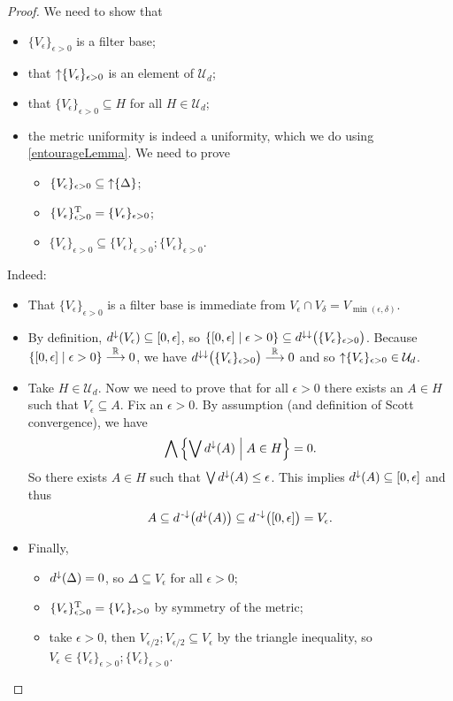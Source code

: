 \begin{proof}
We need to show that
\begin{itemize}
\item $\{V_\epsilon\}_{\epsilon>0}$ is a filter base;
\item that $\operatorname{\uparrow}\{V_\epsilon\}_{\epsilon>0}$ is an element of $\mathcal{U}_d$;
\item that $\{V_\epsilon\}_{\epsilon>0}\subseteq H$ for all $H\in \mathcal{U}_d$;
\item the metric uniformity is indeed a uniformity, which we do using \ref{entourageLemma}. We need to prove
\begin{itemize}
\item $\{V_\epsilon\}_{\epsilon>0}\subseteq\operatorname{\uparrow}\{\Delta\}$;
\item $\{V_\epsilon\}_{\epsilon>0}^{\mathrm{T}} = \{V_\epsilon\}_{\epsilon>0}$;
\item $\{V_\epsilon\}_{\epsilon>0} \subseteq \{V_\epsilon\}_{\epsilon>0}; \{V_\epsilon\}_{\epsilon>0}$.
\end{itemize}
\end{itemize}
Indeed:
\begin{itemize}
\item That $\{V_\epsilon\}_{\epsilon>0}$ is a filter base is immediate from $V_\epsilon \cap V_\delta = V_{\min(\epsilon, \delta)}$.
\item By definition, $d^{\imf}(V_\epsilon) \subseteq \interval{0,\epsilon}$, so $\setbuilder{\interval{0,\epsilon}}{\epsilon>0} \subseteq d^{\imf\imf}\big(\{V_\epsilon\}_{\epsilon>0}\big)$. Because $\setbuilder{\interval{0,\epsilon}}{\epsilon>0} \overset{\R}{\longrightarrow} 0$, we have $d^{\downarrow\downarrow}\big(\{V_\epsilon\}_{\epsilon>0}\big) \overset{\mathbb{R}}{\longrightarrow} 0$ and so $\operatorname{\uparrow}\{V_\epsilon\}_{\epsilon>0} \in \mathcal{U}_d$.
\item Take $H\in \mathcal{U}_d$. 
Now we need to prove that for all $\epsilon >0$ there exists an $A\in H$ such that $V_\epsilon \subseteq A$. Fix an $\epsilon > 0$. By assumption (and definition of Scott convergence), we have
\[ \bigwedge \left\{ \bigvee d^\downarrow(A) \;\middle|\; A\in H \right\} = 0. \]
So there exists $A\in H$ such that $\bigvee d^\downarrow(A) \leq \epsilon$. This implies $d^\imf(A) \subseteq \interval{0,\epsilon}$ and thus
\[ A \subseteq d^\preimf\big(d^{\imf}(A)\big) \subseteq d^\preimf\big(\interval{0,\epsilon}\big) = V_\epsilon. \]
\item Finally,
\begin{itemize}
\item $d^{\downarrow}(\Delta) = 0$, so $\Delta \subseteq V_\epsilon$ for all $\epsilon > 0$;
\item $\{V_\epsilon\}_{\epsilon>0}^{\mathrm{T}} = \{V_\epsilon\}_{\epsilon>0}$ by symmetry of the metric;
\item take $\epsilon>0$, then $V_{\epsilon/2};V_{\epsilon/2} \subseteq V_\epsilon$ by the triangle inequality, so $V_\epsilon \in \{V_\epsilon\}_{\epsilon>0}; \{V_\epsilon\}_{\epsilon>0}$.
\end{itemize}
\end{itemize}
\end{proof}
